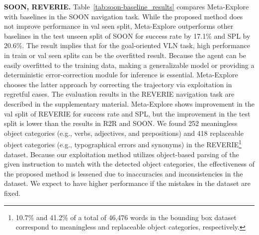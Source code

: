 \documentclass[10pt,twocolumn,letterpaper]{article}
\begin{document}
\noindent\textbf{SOON, REVERIE.}
Table~\ref{tab:soon-baseline_results} compares Meta-Explore with baselines in the SOON navigation task. While the proposed method does not improve performance in val seen split, Meta-Explore outperforms other baselines in the test unseen split of SOON for success rate by 17.1\% and SPL by 20.6\%. The result implies that for the goal-oriented VLN task, high performance in train or val seen splits can be the overfitted result. Because the agent can be easily overfitted to the training data, making a generalizable model or providing a deterministic error-correction module for inference is essential. Meta-Explore chooses the latter approach by correcting the trajectory via exploitation in regretful cases. The evaluation results in the REVERIE navigation task are described in the supplementary material. Meta-Explore shows improvement in the val split of REVERIE for success rate and SPL, but the improvement in the test split is lower than the results in R2R and SOON. We found 252 meaningless object categories (e.g., verbs, adjectives, and prepositions) and 418 replaceable object categories (e.g., typographical errors and synonyms) in the REVERIE\footnote{10.7\% and 41.2\% of a total of 46,476 words in the bounding box dataset correspond to meaningless and replaceable object categories, respectively.} dataset. Because our exploitation method utilizes object-based parsing of the given instruction to match with the detected object categories, the effectiveness of the proposed method is lessened due to inaccuracies and inconsistencies in the dataset. We expect to have higher performance if the mistakes in the dataset are fixed.
\vspace{-0.2cm}
\end{document}
